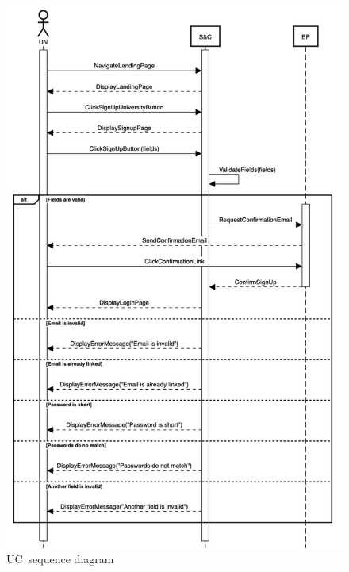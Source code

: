 \begin{figure}
    \centering
    \includegraphics[width=13cm]{images/sequence-diagrams/university-signs-up.png}
    \caption{UC\theuc\ sequence diagram}
\end{figure}


\clearpage

